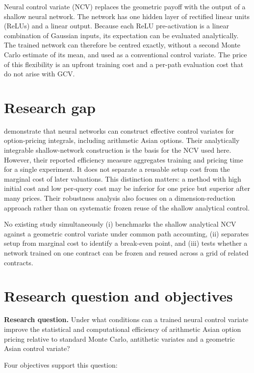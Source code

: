 Neural control variate (NCV) replaces the geometric payoff with the output of a shallow neural network. The network has one hidden layer of rectified linear units (ReLUs) and a linear output. Because each ReLU pre-activation is a linear combination of Gaussian inputs, its expectation can be evaluated analytically. The trained network can therefore be centred exactly, without a second Monte Carlo estimate of its mean, and used as a conventional control variate. The price of this flexibility is an upfront training cost and a per-path evaluation cost that do not arise with GCV.

\section{Research gap}

\textcite{el_filali_ech-chafiq_lelong_reghai_2021} demonstrate that neural networks can construct effective control variates for option-pricing integrals, including arithmetic Asian options. Their analytically integrable shallow-network construction is the basis for the NCV used here. However, their reported efficiency measure aggregates training and pricing time for a single experiment. It does not separate a reusable setup cost from the marginal cost of later valuations. This distinction matters: a method with high initial cost and low per-query cost may be inferior for one price but superior after many prices. Their robustness analysis also focuses on a dimension-reduction approach rather than on systematic frozen reuse of the shallow analytical control.

No existing study simultaneously (i) benchmarks the shallow analytical NCV against a geometric control variate under common path accounting, (ii) separates setup from marginal cost to identify a break-even point, and (iii) tests whether a network trained on one contract can be frozen and reused across a grid of related contracts.

\section{Research question and objectives}

\textbf{Research question.} Under what conditions can a trained neural control variate improve the statistical and computational efficiency of arithmetic Asian option pricing relative to standard Monte Carlo, antithetic variates and a geometric Asian control variate?

Four objectives support this question:

